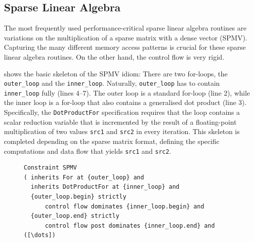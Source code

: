 \subsection{Sparse Linear Algebra}

    The most frequently used performance-critical sparse linear algebra routines
    are variations on the multiplication of a sparse matrix with a dense vector
    (SPMV).
    Capturing the many different memory access patterns is crucial for these
    sparse linear algebra routines.
    On the other hand, the control flow is very rigid.

     shows the basic skeleton of the SPMV idiom:
    There are two for-loops, the {\tt outer\_loop} and the {\tt inner\_loop}.
    Naturally, {\tt outer\_loop} has to contain {\tt inner\_loop} fully
    (lines 4--7).
    The outer loop is a standard for-loop (line 2), while the inner loop is a
    for-loop that also contains a generalised dot product (line 3).
    Specifically, the {\tt DotProductFor} specification requires that the
    loop contains a scalar reduction variable that is incremented by the result
    of a floating-point multiplication of two values {\tt src1} and {\tt src2}
    in every iteration.
    This skeleton is completed depending on the sparse matrix format, defining
    the specific computations and data flow that yields {\tt src1} and
    {\tt src2}.

\begin{figure}[p]
\begin{lstlisting}[language=IDL, label={spmvbase}, caption=
   {Skeleton of the sparse matrix-vector product (SPMV) constraint
    specification in IDL: The precise sparse access patterns are specific to
    chosen storage formats for sparse matrices.}]
Constraint SPMV
( inherits For at {outer_loop} and
  inherits DotProductFor at {inner_loop} and
  {outer_loop.begin} strictly
      control flow dominates {inner_loop.begin} and
  {outer_loop.end} strictly
      control flow post dominates {inner_loop.end} and
([\dots])
\end{lstlisting}
\end{figure}

